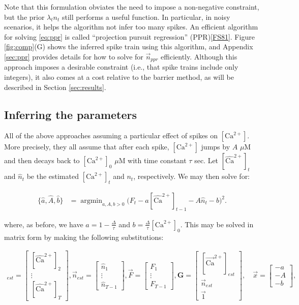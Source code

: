 \documentclass[12pt]{article}
\providecommand{\ve}[1]{\vec{#1}}
\providecommand{\ma}[1]{\boldsymbol{#1}}
\providecommand{\ve}[1]{\boldsymbol{#1}}
\DeclareMathOperator*{\argmin}{argmin}
\newcommand{\Ca}{[\text{Ca}^{2+}]}
\newcommand{\Cae}{[\widehat{\text{Ca}}^{2+}]}
\newcommand{\Cav}{[\ve{\text{Ca}}^{2+}]}
\begin{document}
\noindent Note that this formulation obviates the need to impose a non-negative constraint, but the prior  $\lambda_t n_t$ still performs a useful function.  In particular, in noisy scenarios, it helps the algorithm not infer too many spikes.  An efficient algorithm for solving \eqref{eq:ppr} is called ``projection pursuit regression'' (PPR)\ref{FS81}.  Figure \ref{fig:comp}(G) shows the inferred spike train using this algorithm, and Appendix \ref{sec:ppr} provides details for how to solve for $\ve{n}_{ppr}$ efficiently. Although this approach imposes a desirable constraint (i.e., that spike trains include only integers), it also comes at a cost relative to the barrier method, as will be described in Section \ref{sec:results}.

\subsection{Inferring the parameters}

All of the above approaches assuming a particular effect of spikes on $\Ca$.  More precisely, they all assume that after each spike, $\Ca$ jumps by $A$ $\mu$M and then decays back to $\Ca_0$ $\mu$M with time constant $\tau$ sec.  Let $\Cae_t$ and $\widehat{n}_t$ be the estimated $\Ca_t$ and $n_t$, respectively.  We may then solve for:

\begin{align}
\{\widehat{a}, \widehat{A}, \widehat{b}\} &= \argmin_{a,A,b>0} \big(F_t - a \Cae_{t-1} - A \widehat{n}_t - b\big)^2.
\end{align}

\noindent where, as before, we have $a=1-\frac{\Delta}{\tau}$ and $b=\frac{\Delta}{\tau}\Ca_0$. This may be solved in matrix form by making the following substitutions:

\begin{align}
\Cav_{est} =\begin{bmatrix} \Cae_2\\ \vdots \\ \Cae_T \end{bmatrix},
\ve{n}_{est}=\begin{bmatrix} \widehat{n}_1\\ \vdots \\ \widehat{n}_{T-1} \end{bmatrix},
\ve{F}=\begin{bmatrix} F_1\\ \vdots \\ F_{T-1} \end{bmatrix},
\ma{G}=\begin{bmatrix} \Cav_{est}\\ \ve{n}_{est}\\ \ve{1} \end{bmatrix},
\quad \ve{x}=\begin{bmatrix} -a\\ -A\\ -b \end{bmatrix},
\end{align}
\end{document}
